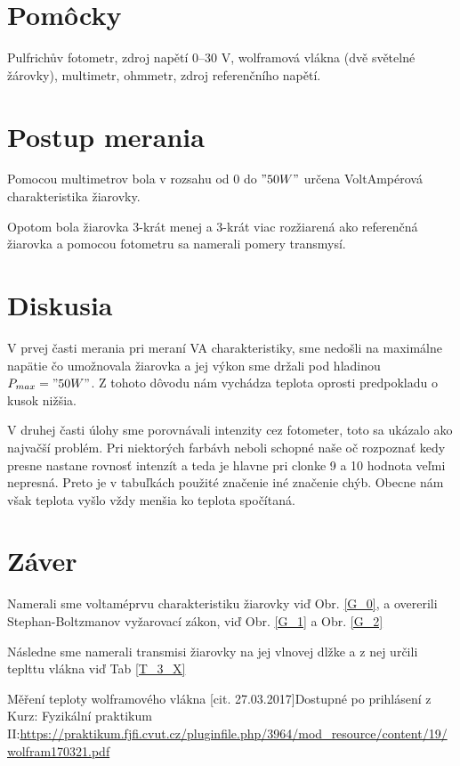 \documentclass[10pt]{scrartcl}
\begin{document}
\MakeFJFIHead{}






\section{Pomôcky}
Pulfrichův fotometr, zdroj napětí 0–30 V, wolframová vlákna (dvě světelné žárovky),
multimetr, ohmmetr, zdroj referenčního napětí.

\section{Postup merania}
Pomocou multimetrov bola v rozsahu od $0$ do $"50 W"$ určena VoltAmpérová charakteristika žiarovky.

Opotom bola žiarovka 3-krát menej a 3-krát viac rozžiarená ako referenčná žiarovka a pomocou fotometru sa namerali pomery transmysí.




\section{Diskusia}

V prvej časti merania pri meraní VA charakteristiky, sme nedošli na maximálne napätie čo umožnovala žiarovka a jej výkon sme držali pod hladinou $P_{max}="50 W"$. Z tohoto dôvodu nám vychádza teplota oprosti predpokladu o kusok nižšia.

V druhej časti úlohy sme porovnávali intenzity cez fotometer, toto sa ukázalo ako najvačší problém. Pri niektorých farbávh neboli schopné naše oč rozpoznať kedy presne nastane rovnosť intenzít a teda je hlavne pri clonke 9 a 10 hodnota veľmi nepresná. Preto je v tabuľkách použité značenie iné značenie chýb. Obecne nám však teplota vyšlo vždy menšia ko teplota spočítaná.

\section{Záver}

Namerali sme voltaméprvu charakteristiku žiarovky viď Obr. \ref{G_0}, a overerili Stephan-Boltzmanov vyžarovací zákon, viď Obr. \ref{G_1} a Obr. \ref{G_2}

Následne sme namerali transmisi žiarovky na jej vlnovej dlžke a z nej určili teplttu vlákna viď Tab \ref{T_3_X}

\begin{thebibliography}{2}
Měření teploty wolframového vlákna [cit. 27.03.2017]Dostupné po prihlásení z Kurz: Fyzikální praktikum II:\url{https://praktikum.fjfi.cvut.cz/pluginfile.php/3964/mod_resource/content/19/wolfram170321.pdf}



\end{thebibliography}
\end{document}
